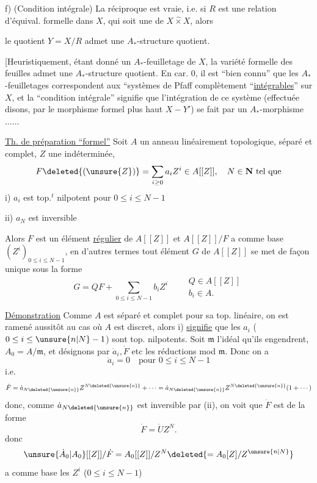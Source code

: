 f) (Condition intégrale) La réciproque est vraie, i.e. si $R$ est une relation d'équival. formelle dans $X$, qui soit une  de $X\mathbin{\hat\times}X$, alors

le quotient  $Y=X/R$ admet une $A_*$-structure quotient.

[Heuristiquement, étant donné un $A_*$-feuilletage de $X$, la variété formelle des feuilles admet une $A_*$-structure quotient. En car. 0, il est ``bien connu'' que les $A_*$-feuilletages correspondent aux ``systèmes de Pfaff complètement ``\uline{intégrables}'' sur $X$, et la ``condition intégrale'' signifie que l'intégration de ce système (effectuée disons, par le morphisme formel plus haut $X\mathbin{-}Y'$) se fait par un $A_*$-morphisme$\ldots\ldots$

\uline{Th. de préparation ``formel''} Soit $A$ un anneau linéairement topologique, séparé et complet, $Z$ une indéterminée,
\[
F\deleted{(\unsure{Z})}=\sum_{i\geq0}a_iZ^i\in A[[Z]],\quad N\in\mathbf N\text{ tel que}
\]
i) $a_i$ est top.$^t$ nilpotent pour $0\leq i\leq N-1$

ii) $a_N$ est inversible

Alors $F$ est un élément \uline{régulier} de $A[[Z]]$ et $A[[Z]]/F$ a comme base $(Z^i)_{0\leq i\leq N-1}$, en d'autres termes tout élément $G$ de $A[[Z]]$ se met de façon unique sous la forme
\[
G=QF+\sum_{0\leq i\leq N-1}b_iZ^i\qquad
\begin{array}{l}Q\in A[[Z]]\\b_i\in A.\end{array}
\]

\uline{Démonstration} Comme $A$ est séparé et complet pour sa top. linéaire, on est ramené aussitôt au cas où $A$ est discret, alors i) \uline{signifie} que les $a_i$ ($0\leq i\leq\unsure{n|N}-1$) sont top. nilpotents. Soit $\mathfrak m$ l'idéal  qu'ils engendrent, $A_0=A/\mathfrak m$, et désignons par $\dot a_i,\dot F$ etc les réductions mod $\mathfrak m$.  Donc on a 
\[
\dot a_i=0\quad\text{pour }0\leq i\leq N-1
\]
i.e.
\[
\dot F=\dot a_{N\deleted{\unsure{n}}}Z^{N\deleted{\unsure{n}}}+\cdots
=\dot a_{N\deleted{\unsure{n}}}Z^{N\deleted{\unsure{n}}}(1+\cdots)
\]
donc, comme $\dot a_{N\deleted{\unsure{n}}}$ est inversible par (ii), on voit que $\dot F$ est de la forme
\[
\dot F=\dot U Z^N.
\]
 donc
\[
\unsure{\dot A_0|A_0}[[Z]]/\dot F=A_0[[Z]]/Z^N\deleted{=A_0[Z]/Z^{\unsure{n|N}}}
\]
a comme base les $Z^i$ ($0\leq i\leq N-1$)

